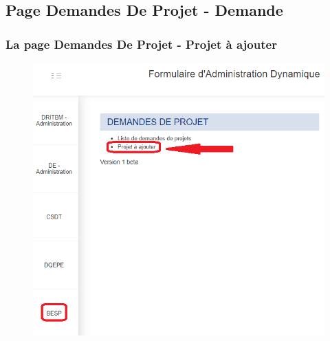 \documentclass[aspectratio=169]{beamer}%
\begin{document}
\subsection{Page Demandes De Projet - Demande}
\begin{frame}
\transwipe 
\label{pictures}
\frametitle{La page Demandes De Projet - Projet à ajouter}

\begin{figure}
\includegraphics[scale=0.33]{home_list2}
\end{figure}
\end{frame}
\end{document}
